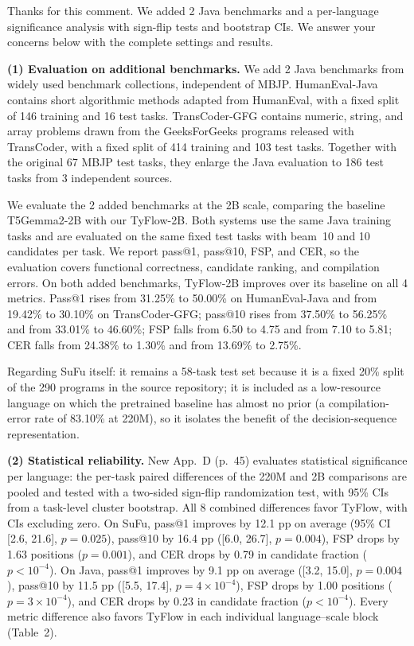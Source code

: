 \documentclass[11pt,a4paper]{article}
\newcommand{\response}{\par\medskip\needspace{3\baselineskip}\noindent{\bfseries\color{accent}Response.}%
  \par\nopagebreak\smallskip\ignorespaces}
\begin{document}
\response Thanks for this comment. We added 2 Java benchmarks and a per-language significance analysis with sign-flip tests and bootstrap CIs. We answer your concerns below with the complete settings and results.

\textbf{(1) Evaluation on additional benchmarks.} We add 2 Java benchmarks from widely used benchmark collections, independent of MBJP. HumanEval-Java contains short algorithmic methods adapted from HumanEval, with a fixed split of 146 training and 16 test tasks. TransCoder-GFG contains numeric, string, and array problems drawn from the GeeksForGeeks programs released with TransCoder, with a fixed split of 414 training and 103 test tasks. Together with the original 67 MBJP test tasks, they enlarge the Java evaluation to 186 test tasks from 3 independent sources.

We evaluate the 2 added benchmarks at the 2B scale, comparing the baseline T5Gemma2-2B with our TyFlow-2B. Both systems use the same Java training tasks and are evaluated on the same fixed test tasks with beam~10 and 10 candidates per task. We report pass@1, pass@10, FSP, and CER, so the evaluation covers functional correctness, candidate ranking, and compilation errors. On both added benchmarks, TyFlow-2B improves over its baseline on all 4 metrics. Pass@1 rises from 31.25\% to 50.00\% on HumanEval-Java and from 19.42\% to 30.10\% on TransCoder-GFG; pass@10 rises from 37.50\% to 56.25\% and from 33.01\% to 46.60\%; FSP falls from 6.50 to 4.75 and from 7.10 to 5.81; CER falls from 24.38\% to 1.30\% and from 13.69\% to 2.75\%.

Regarding SuFu itself: it remains a 58-task test set because it is a fixed 20\% split of the 290 programs in the source repository; it is included as a low-resource language on which the pretrained baseline has almost no prior (a compilation-error rate of 83.10\% at 220M), so it isolates the benefit of the decision-sequence representation.

\textbf{(2) Statistical reliability.} New App.~D (p.~45) evaluates statistical significance per language: the per-task paired differences of the 220M and 2B comparisons are pooled and tested with a two-sided sign-flip randomization test, with 95\% CIs from a task-level cluster bootstrap. All 8 combined differences favor TyFlow, with CIs excluding zero. On SuFu, pass@1 improves by 12.1 pp on average (95\% CI [2.6, 21.6], $p=0.025$), pass@10 by 16.4 pp ([6.0, 26.7], $p=0.004$), FSP drops by 1.63 positions ($p=0.001$), and CER drops by 0.79 in candidate fraction ($p<10^{-4}$). On Java, pass@1 improves by 9.1 pp on average ([3.2, 15.0], $p=0.004$), pass@10 by 11.5 pp ([5.5, 17.4], $p=4{\times}10^{-4}$), FSP drops by 1.00 positions ($p=3{\times}10^{-4}$), and CER drops by 0.23 in candidate fraction ($p<10^{-4}$). Every metric difference also favors TyFlow in each individual language--scale block (Table~2).
\end{document}

